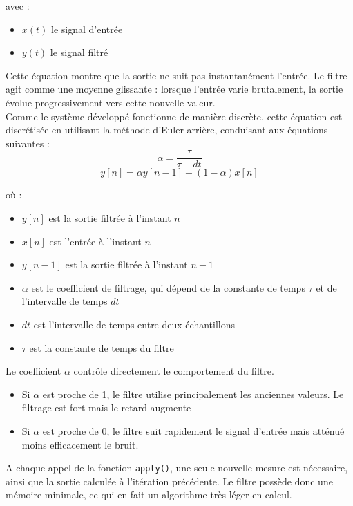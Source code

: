 avec :
\begin{itemize}
    \item $x(t)$ le signal d'entrée
    \item $y(t)$ le signal filtré
\end{itemize}

Cette équation montre que la sortie ne suit pas instantanément l'entrée. Le filtre agit comme une moyenne glissante : lorsque l'entrée varie brutalement, la sortie évolue progressivement vers cette nouvelle valeur. \\

Comme le système développé fonctionne de manière discrète, cette équation est discrétisée en utilisant la méthode d'Euler arrière, conduisant aux équations suivantes :
\begin{equation}
    \alpha = \frac{\tau}{\tau + dt}
\end{equation}
\begin{equation}
    y[n] = \alpha y[n-1] + (1 - \alpha)x[n]
\end{equation}

où : 
\begin{itemize}
    \item $y[n]$ est la sortie filtrée à l'instant $n$
    \item $x[n]$ est l'entrée à l'instant $n$
    \item $y[n-1]$ est la sortie filtrée à l'instant $n-1$
    \item $\alpha$ est le coefficient de filtrage, qui dépend de la constante de temps $\tau$ et de l'intervalle 
    de temps $dt$
    \item $dt$ est l'intervalle de temps entre deux échantillons
    \item $\tau$ est la constante de temps du filtre
\end{itemize}

Le coefficient $\alpha$ contrôle directement le comportement du filtre.
\begin{itemize}
    \item Si $\alpha$ est proche de 1, le filtre utilise principalement les anciennes valeurs. Le filtrage est 
    fort mais le retard augmente
    \item Si $\alpha$ est proche de 0, le filtre suit rapidement le signal d'entrée mais atténué moins efficacement 
    le bruit.
\end{itemize}

A chaque appel de la fonction \texttt{apply()}, une seule nouvelle mesure est nécessaire, ainsi que la sortie calculée à l'itération précédente. Le filtre possède donc une mémoire minimale, ce qui en fait un algorithme très léger en calcul.


